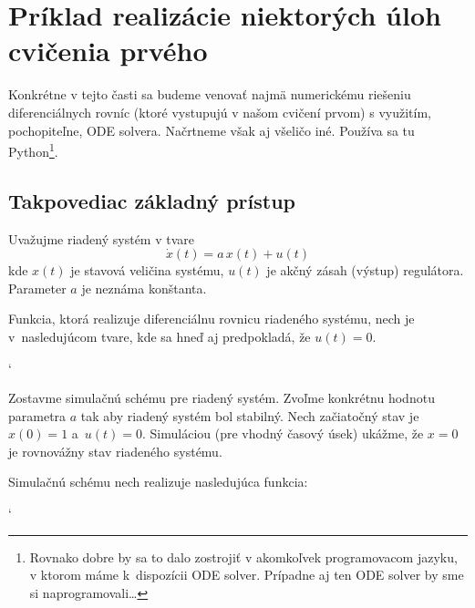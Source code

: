 \documentclass[a4paper, 10pt, ]{article}
\begin{document}
\section{Príklad realizácie niektorých úloh cvičenia prvého}

Konkrétne v tejto časti sa budeme venovať najmä numerickému riešeniu diferenciálnych rovníc (ktoré vystupujú v našom cvičení prvom) s využitím, pochopiteľne, ODE solvera. Načrtneme však aj všeličo iné. Používa sa tu Python\footnote{Rovnako dobre by sa to dalo zostrojiť v akomkoľvek programovacom jazyku, v ktorom máme k~dispozícii ODE solver. Prípadne aj ten ODE solver by sme si naprogramovali\ldots}.





\subsection{Takpovediac základný prístup}



Uvažujme riadený systém v tvare
\begin{equation}
	\dot{x}(t) = a\, x(t) + u(t)
\end{equation}
kde $x(t)$ je stavová veličina systému, $u(t)$ je akčný zásah (výstup) regulátora. Parameter $a$ je neznáma konštanta.

Funkcia, ktorá realizuje diferenciálnu rovnicu riadeného systému, nech je v~nasledujúcom tvare, kde sa hneď aj predpokladá, že $u(t)=0$.

{\catcode`

}

Zostavme simulačnú schému pre riadený systém. Zvoľme konkrétnu hodnotu parametra $a$ tak aby riadený systém bol stabilný. Nech začiatočný stav je $x(0) = 1$ a~$u(t)=0$. Simuláciou (pre vhodný časový úsek) ukážme, že $x = 0$ je rovnovážny stav riadeného systému.

\noindent
Simulačnú schému nech realizuje nasledujúca funkcia:

{\catcode`

}
\end{document}

